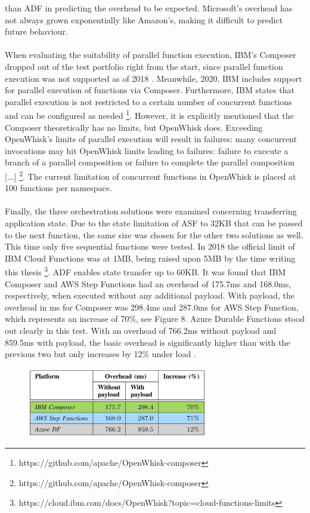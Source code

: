 \documentclass[a4paper,twoside,11pt, pagesize]{scrartcl}
\begin{document}
\begin{spacing}{1.2}
than ADF in predicting the overhead to be expected. Microsoft's overhead has not always grown exponentially like Amazon's, making it difficult to predict future behaviour.\\\\ When evaluating the suitability of parallel function execution, IBM's Composer dropped out of the test portfolio right from the start, since parallel function execution was not supported as of 2018 \cite{lopez2018comparison}. Meanwhile, 2020, IBM includes support for parallel execution of functions via Composer. Furthermore, IBM states that parallel execution is not restricted to a certain number of concurrent functions and can be configured as needed \footnote{https://github.com/apache/OpenWhisk-composer }. However, it is explicitly mentioned that the Composer theoretically has no limits, but OpenWhisk does. Exceeding OpenWhisk's limits of parallel execution will result in failures: \glqq[...] many concurrent invocations may hit OpenWhisk limits leading to failures: failure to execute a branch of a parallel composition or failure to complete the parallel composition [...]\grqq{} \footnote{https://github.com/apache/OpenWhisk-composer}. The current limitation of concurrent functions in OpenWhisk is placed at 100 functions per namespace.\\\\ Finally, the three orchestration solutions were examined concerning transferring application state. Due to the state limitation of ASF to 32KB that can be passed to the next function, the same size was chosen for the other two solutions as well. This time only five sequential functions were tested. In 2018 the official limit of IBM Cloud Functions was at 1MB, being raised upon 5MB by the time writing this thesis \footnote{https://cloud.ibm.com/docs/OpenWhisk?topic=cloud-functions-limits}. ADF enables state transfer up to 60KB. It was found that IBM Composer and AWS Step Functions had an overhead of 175.7ms and 168.0ms, respectively,  when executed without any additional payload. With payload, the overhead in ms for Composer was 298.4ms and 287.0ms for AWS Step Function, which represents an increase of 70\%, see Figure 8. Azure Durable Functions stood out clearly in this test. With an overhead of 766.2ms without payload and 859.5ms with payload, the basic overhead is significantly higher than with the previous two but only increases by 12\% under load \cite{lopez2018comparison}.
\begin{figure}[H]
\label{fig:orchestration}
\centering
\includegraphics[width=0.7\textwidth]{Orchestration}

\end{figure}
\end{spacing}
\end{document}
